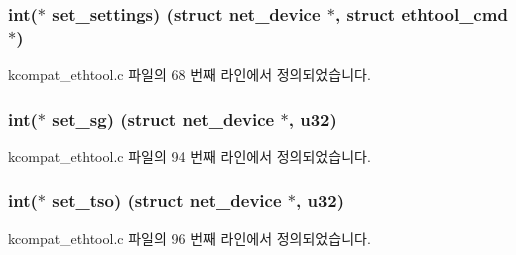 \subsubsection[{\texorpdfstring{set\+\_\+settings}{set_settings}}]{\setlength{\rightskip}{0pt plus 5cm}int($\ast$ set\+\_\+settings) (struct net\+\_\+device $\ast$, struct ethtool\+\_\+cmd $\ast$)}\hypertarget{struct__kc__ethtool__ops_a362b7aebd89cfa9c434326bd391eae60}{}\label{struct__kc__ethtool__ops_a362b7aebd89cfa9c434326bd391eae60}


kcompat\+\_\+ethtool.\+c 파일의 68 번째 라인에서 정의되었습니다.

\subsubsection[{\texorpdfstring{set\+\_\+sg}{set_sg}}]{\setlength{\rightskip}{0pt plus 5cm}int($\ast$ set\+\_\+sg) (struct net\+\_\+device $\ast$, {\bf u32})}\hypertarget{struct__kc__ethtool__ops_a017b7a4a581bf4b6a271848c27f409e5}{}\label{struct__kc__ethtool__ops_a017b7a4a581bf4b6a271848c27f409e5}


kcompat\+\_\+ethtool.\+c 파일의 94 번째 라인에서 정의되었습니다.

\subsubsection[{\texorpdfstring{set\+\_\+tso}{set_tso}}]{\setlength{\rightskip}{0pt plus 5cm}int($\ast$ set\+\_\+tso) (struct net\+\_\+device $\ast$, {\bf u32})}\hypertarget{struct__kc__ethtool__ops_ace21bc045c02d1abf1423f1b1176e985}{}\label{struct__kc__ethtool__ops_ace21bc045c02d1abf1423f1b1176e985}


kcompat\+\_\+ethtool.\+c 파일의 96 번째 라인에서 정의되었습니다.

